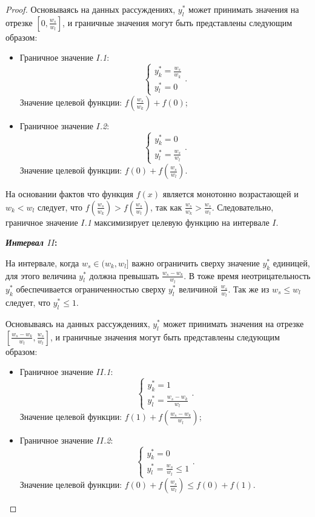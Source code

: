 \begin{proof}
Основываясь на данных рассуждениях, $y_l^{*}$ может принимать значения на отрезке $\left[0, \frac{w_s}{w_l}\right]$, и граничные значения могут быть представлены следующим образом:
\begin{itemize}
	\item Граничное значение \textit{$I$.1}:
		$$\begin{cases}
		y_k^{*} = \frac{w_s}{w_k}\\
		y_l^{*} = 0
		\end{cases}.$$
		Значение целевой функции: $f\left(\frac{w_s}{w_k}\right) + f(0)$;
	\item Граничное значение \textit{$I$.2}:
		$$\begin{cases}
		y_k^{*} = 0\\
		y_l^{*} = \frac{w_s}{w_l}
		\end{cases}.$$
		Значение целевой функции: $f(0) + f\left(\frac{w_s}{w_l}\right)$.
\end{itemize}

На основании фактов что функция $f(x)$ является монотонно возрастающей и $w_k < w_l$ следует, что $f\left(\frac{w_s}{w_k}\right) > f\left(\frac{w_s}{w_l}\right)$, так как $\frac{w_s}{w_k} > \frac{w_s}{w_l}$. Следовательно, граничное значение \textit{$I$.1} максимизирует целевую функцию на интервале $I$.

\textbf{\textit{Интервал $II$}:}

На интервале, когда $w_s \in (w_k, w_l]$ важно ограничить сверху значение $y_k^{*}$ единицей, для этого величина $y_l^{*}$ должна превышать $\frac{w_s - w_k}{w_l}$. В тоже время неотрицательность $y_k^{*}$ обеспечивается ограниченностью сверху $y_l^{*}$ величиной $\frac{w_s}{w_l}$. Так же из $w_s \leq w_l$ следует, что $y_l^{*} \leq 1$.

Основываясь на данных рассуждениях, $y_l^{*}$ может принимать значения на отрезке $\left[\frac{w_s - w_k}{w_l}, \frac{w_s}{w_l}\right]$, и граничные значения могут быть представлены следующим образом:

\begin{itemize}
	\item Граничное значение \textit{$II$.1}:
		$$\begin{cases}
		y_k^{*} = 1 \\
		y_l^{*} = \frac{w_s - w_k}{w_l}
		\end{cases}.$$
		Значение целевой функции: $f(1) + f\left(\frac{w_s - w_k}{w_l}\right)$;
	\item Граничное значение \textit{$II$.2}:
		$$\begin{cases}
		y_k^{*} = 0\\
		y_l^{*} = \frac{w_s}{w_l} \leq 1
		\end{cases}.$$
		Значение целевой функции: $f(0) + f\left(\frac{w_s}{w_l}\right) \leq f(0) + f(1)$.
\end{itemize}


\end{proof}
